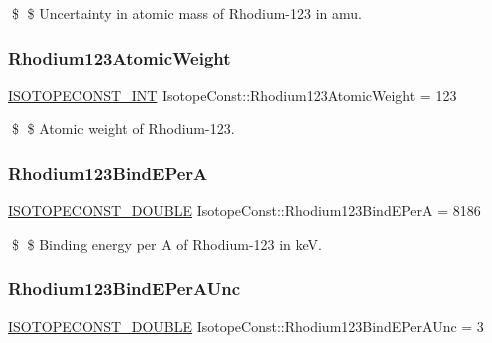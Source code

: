 \$ \$ Uncertainty in atomic mass of Rhodium-\/123 in amu. \mbox{\label{group___isotope_const-_rhodium-_rh123_ga328d3cf89ef2f8989aa77610c0bb67ed}} 
\subsubsection{\texorpdfstring{Rhodium123\+Atomic\+Weight}{Rhodium123AtomicWeight}}
{\footnotesize\ttfamily \mbox{\hyperlink{group___isotope_const-_macros_ga5f18360b3e99483a35c32d789e62621c}{I\+S\+O\+T\+O\+P\+E\+C\+O\+N\+S\+T\+\_\+\+I\+NT}} Isotope\+Const\+::\+Rhodium123\+Atomic\+Weight = 123}

\$ \$ Atomic weight of Rhodium-\/123. \mbox{\label{group___isotope_const-_rhodium-_rh123_ga945fa79bc54914e85cd85917bf86891a}} 
\subsubsection{\texorpdfstring{Rhodium123\+Bind\+E\+PerA}{Rhodium123BindEPerA}}
{\footnotesize\ttfamily \mbox{\hyperlink{group___isotope_const-_macros_ga8f45a7272ce02c0b4c65c44636ed719a}{I\+S\+O\+T\+O\+P\+E\+C\+O\+N\+S\+T\+\_\+\+D\+O\+U\+B\+LE}} Isotope\+Const\+::\+Rhodium123\+Bind\+E\+PerA = 8186}

\$ \$ Binding energy per A of Rhodium-\/123 in keV. \mbox{\label{group___isotope_const-_rhodium-_rh123_ga1340bd94a4b2c673454e1b3655c174c3}} 
\subsubsection{\texorpdfstring{Rhodium123\+Bind\+E\+Per\+A\+Unc}{Rhodium123BindEPerAUnc}}
{\footnotesize\ttfamily \mbox{\hyperlink{group___isotope_const-_macros_ga8f45a7272ce02c0b4c65c44636ed719a}{I\+S\+O\+T\+O\+P\+E\+C\+O\+N\+S\+T\+\_\+\+D\+O\+U\+B\+LE}} Isotope\+Const\+::\+Rhodium123\+Bind\+E\+Per\+A\+Unc = 3}

